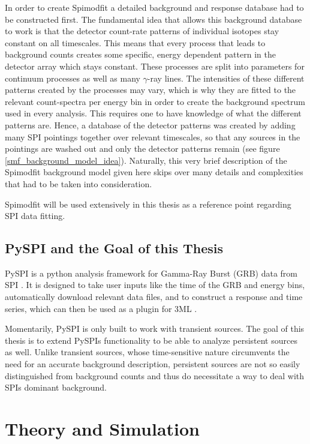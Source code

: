 \documentclass{report}
\begin{document}
In order to create Spimodfit a detailed background and response database had to be constructed first. The fundamental idea that allows this background database to work is that the detector count-rate patterns of individual isotopes stay constant on all timescales. This means that every process that leads to background counts creates some specific, energy dependent pattern in the detector array which stays constant. These processes are split into parameters for continuum processes as well as many $\gamma$-ray lines. The intensities of these different patterns created by the processes may vary, which is why they are fitted to the relevant count-spectra per energy bin in order to create the background spectrum used in every analysis. This requires one to have knowledge of what the different patterns are. Hence, a database of the detector patterns was created by adding many SPI pointings together over relevant timescales, so that any sources in the pointings are washed out and only the detector patterns remain (see figure \ref{smf_background_model_idea}). Naturally, this very brief description of the Spimodfit background model given here skips over many details and complexities that had to be taken into consideration.

Spimodfit will be used extensively in this thesis as a reference point regarding SPI data fitting.



\section{PySPI and the Goal of this Thesis}
PySPI is a python analysis framework for Gamma-Ray Burst (GRB) data from SPI \cite{Biltzinger2022}. It is designed to take user inputs like the time of the GRB and energy bins, automatically download relevant data files, and to construct a response and time series, which can then be used as a plugin for 3ML \cite{3ml}.

Momentarily, PySPI is only built to work with transient sources. The goal of this thesis is to extend PySPIs functionality to be able to analyze persistent sources as well. Unlike transient sources, whose time-sensitive nature circumvents the need for an accurate background description, persistent sources are not so easily distinguished from background counts and thus do necessitate a way to deal with SPIs dominant background.

\chapter{Theory and Simulation}
\end{document}
